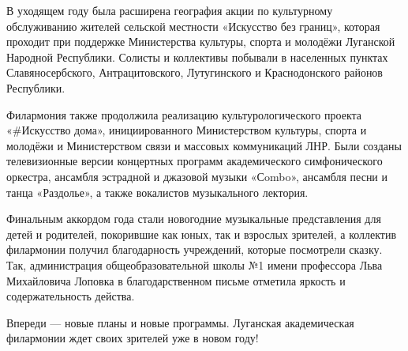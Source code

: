 В уходящем году была расширена география акции по культурному обслуживанию
жителей сельской местности «Искусство без границ», которая проходит при
поддержке Министерства культуры, спорта и молодёжи Луганской Народной
Республики. Солисты и коллективы побывали в населенных пунктах
Славяносербского, Антрацитовского, Лутугинского и Краснодонского районов
Республики.

Филармония также продолжила реализацию культурологического проекта «\#Искусство
дома», инициированного Министерством культуры, спорта и молодёжи и
Министерством связи и массовых коммуникаций ЛНР. Были созданы телевизионные
версии концертных программ академического симфонического оркестра, ансамбля
эстрадной и джазовой музыки «Сombo», ансамбля песни и танца «Раздолье», а также
вокалистов музыкального лектория.

Финальным аккордом года стали новогодние музыкальные представления для детей и
родителей, покорившие как юных, так и взрослых зрителей, а коллектив филармонии
получил благодарность учреждений, которые посмотрели сказку. Так, администрация
общеобразовательной школы №1 имени профессора Льва Михайловича Лоповка в
благодарственном письме отметила яркость и содержательность действа.

Впереди — новые планы и новые программы. Луганская академическая филармонии
ждет своих зрителей уже в новом году!
